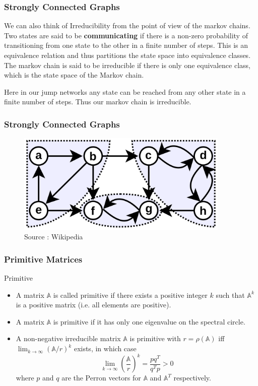 \documentclass[9pt]{beamer}
\newcommand{\A}{\mathbb{A}}
\begin{document}
\begin{frame}
  \frametitle{Strongly Connected Graphs}
  We can also think of Irreducibility from the point of view of the markov chains.
  Two states are said to be \textbf{communicating} if there is a non-zero probability of transitioning from one state to the other in a finite number of steps.
  This is an equivalence relation and thus partitions the state space into equivalence classes. \\ 

  The markov chain is said to be irreducible if there is only one equivalence class, which is the state space of the Markov chain.

  Here in our jump networks any state can be reached from any other state in a finite number of steps. Thus our markov chain is irreducible.

\end{frame}
\begin{frame}
  \frametitle{Strongly Connected Graphs}
  
  \begin{figure}
    \includegraphics[width = 4in]{scc.png}
    \caption{Source : Wikipedia}
  \end{figure}
\end{frame}
\begin{frame}
  \frametitle{Primitive Matrices}
  \begin{block}{Primitive}
    \begin{itemize}
      \item A matrix $\A$ is called primitive if there exists a positive integer $k$ such that $\A^k$ is a positive matrix (i.e. all elements are positive).
      \item A matrix $\A$ is primitive if it has only one eigenvalue on the spectral circle.
      \item A non-negative irreducible matrix $\A $ is primitive with $r = \rho(\A)$ iff $\lim_{k \to \infty} (\A\slash r)^k$ exists, in which case
            $$\lim_{k \to \infty} \left(\frac{\A}{r}\right)^k = \frac{p q^{T}}{q^{T} p} > 0$$
            where $p$ and $q$ are the Perron vectors for $\A$ and $\A^T$ respectively. 
    \end{itemize}

  \end{block}
\end{frame}
\end{document}
